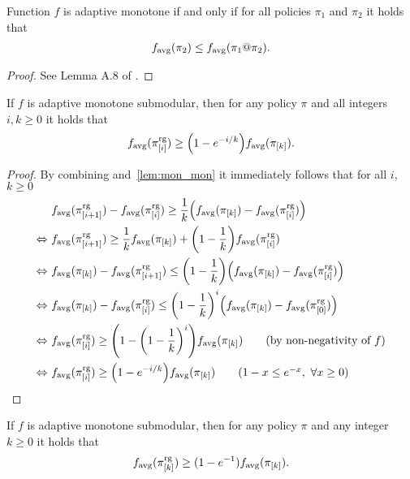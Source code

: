 \begin{lemma}\label{lem:mon_mon}
  Function $f$ is adaptive monotone if and only if for all policies $\pi_1$ and $\pi_2$ it holds that
  \begin{align*}
    f_{\mathrm{avg}}(\pi_2) \leq f_{\mathrm{avg}}(\pi_1 @ \pi_2).
  \end{align*}
\end{lemma}
\begin{proof}
See Lemma A.8 of \citet{golovin11}.
\end{proof}

\begin{theorem}
  If $f$ is adaptive monotone submodular, then for any policy $\pi$ and all integers $i, k \geq 0$ it holds that
  \begin{align*}
    \favg(\pigi) \geq \left(1 - e^{-i/k}\right)\favg(\pik).
  \end{align*}
\end{theorem}
\begin{proof}
  By combining  and~\ref{lem:mon_mon} it immediately follows that for all $i$, $k \geq 0$
  \begin{align*}
                   &\ \favg(\pigii) - \favg(\pigi) \geq \frac{1}{k}\left(\favg(\pik) - \favg(\pigi)\right)\\
    \Leftrightarrow&\ \favg(\pigii) \geq \frac{1}{k}\favg(\pik) + \left(1 - \frac{1}{k}\right) \favg(\pigi)\\
    \Leftrightarrow&\ \favg(\pik) - \favg(\pigii) \leq \left(1 - \frac{1}{k}\right)\left(\favg(\pik) - \favg(\pigi)\right)\\
    \Leftrightarrow&\ \favg(\pik) - \favg(\pigi) \leq \left(1 - \frac{1}{k}\right)^{i}\left(\favg(\pik) - \favg(\pigo)\right)\\
    \Leftrightarrow&\ \favg(\pigi) \geq \left(1 - \left(1 - \frac{1}{k}\right)^{i}\right)\favg(\pik)\tag*{(by non-negativity of $f$)}\\
    \Leftrightarrow&\ \favg(\pigi) \geq \left(1 - e^{-i/k}\right)\favg(\pik)\tag*{($1 - x \leq e^{-x},\ \forall x \geq 0$)}
  \end{align*}
\end{proof}

\begin{cor}
  If $f$ is adaptive monotone submodular, then for any policy $\pi$ and any integer $k \geq 0$ it holds that
  \begin{align*}
    f_{\mathrm{avg}}(\pi^{\textrm{rg}}_{[k]}) \geq (1 - e^{-1})f_{\mathrm{avg}}(\pi_{[k]}).
  \end{align*}
\end{cor}

